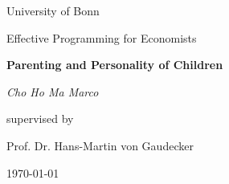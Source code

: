 \documentclass[%
    a4paper,            %
    11pt,               %
    bibliography=totoc, %
]
{scrartcl}
\begin{document}
\begin{titlepage}
	\centering
	
	{\huge University of Bonn \par}
	\vspace{1cm}
	{\LARGE Effective Programming for Economists \par}
	\vspace{1.5cm}
	{\Huge\bfseries Parenting and Personality of Children\par}
	\vspace{2cm}
	{\LARGE\itshape Cho Ho Ma Marco\par}
	\vfill
	{\Large supervised by\par
		Prof. Dr. Hans-Martin von Gaudecker \\[0.2cm]
		}
	
	\vfill
	
	{\Large \today\par}
\end{titlepage}
\pagebreak
\onehalfspacing
\tableofcontents


\pagebreak
\end{document}
